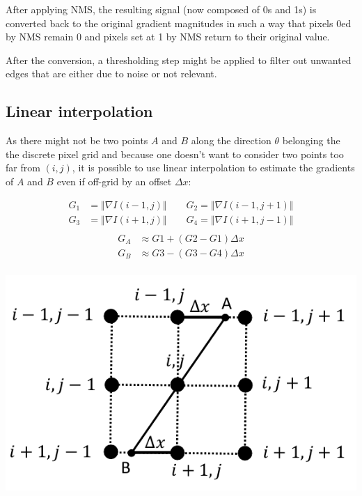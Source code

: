 \begin{remark}
    After applying NMS, the resulting signal (now composed of 0s and 1s) is converted back to the original gradient magnitudes
    in such a way that pixels 0ed by NMS remain 0 and pixels set at 1 by NMS return to their original value.

    After the conversion, a thresholding step might be applied to filter out unwanted edges that are either due to noise or not relevant.
\end{remark}


\subsection{Linear interpolation}

As there might not be two points $A$ and $B$ along the direction $\theta$ belonging the the discrete pixel grid
and because one doesn't want to consider two points too far from $(i, j)$,
it is possible to use linear interpolation to estimate the gradients of $A$ and $B$ even if off-grid by an offset $\Delta x$:\\
\begin{minipage}{0.6\linewidth}
    \[
        \begin{split}
            G_1 &= \Vert \nabla I(i-1, j) \Vert \hspace{2em} G_2 = \Vert \nabla I(i-1, j+1) \Vert \\
            G_3 &= \Vert \nabla I(i+1, j) \Vert \hspace{2em} G_4 = \Vert \nabla I(i+1, j-1) \Vert \\
        \end{split}
    \]
    \[
        \begin{split}
            G_A &\approx G1 + (G2 - G1)\Delta x \\
            G_B &\approx G3 - (G3 - G4)\Delta x \\
        \end{split}
    \]
\end{minipage}
\begin{minipage}{0.35\linewidth}
    \centering
    \includegraphics[width=\linewidth]{./img/_nms_interpolation.pdf}
\end{minipage}



